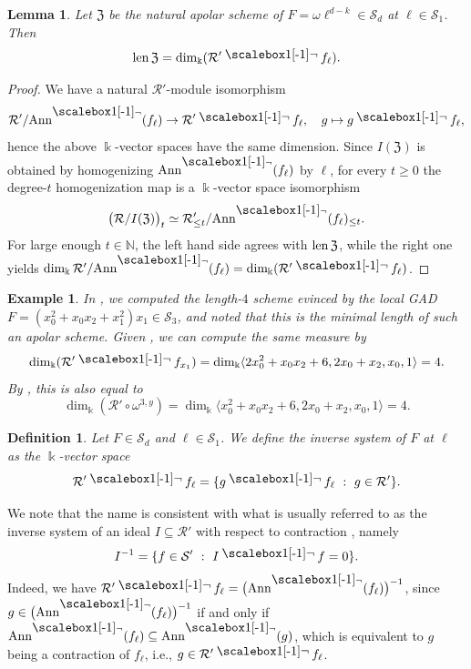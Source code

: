 \documentclass{amsart}
\theoremstyle{plain}
\newtheorem{lemma}[lemma]{Lemma}
\newtheorem{definition}[definition]{Definition}
\newtheorem{example}[example]{Example}
\renewcommand{\k}{\Bbbk}
\renewcommand{\S}{\mathcal{S}}
\newcommand{\N}{\mathbb{N}}
\newcommand{\Ann}{\textnormal{Ann}}
\newcommand{\len}{\textnormal{len}\,}
\newcommand{\contract}{\mathbin{\mathpalette\dointprod\relax}}
\newcommand{\dointprod}[2]{%
  \raisebox{\depth}{\scalebox{1}[-1]{$#1\lnot$}}}
\def\R{\mathcal{R}}
\def\Z{\mathfrak{Z}}
\def\Ann{\mathrm{Ann}}
\numberwithin{equation}{section}
\begin{document}
\begin{lemma} \label{lemma:schemedim}
    Let $\Z$ be the natural apolar scheme of $F = \omega \ell^{d-k} \in \S_d$ at $\ell \in \S_1$. Then
    \[ \len \Z = \dim_{\k} (\R' \contract f_{\ell}). \]
\end{lemma}
\begin{proof}
    We have a natural $\R'$-module isomorphism
    \[ \R'/\Ann^{\contract}(f_{\ell}) \to \R' \contract f_{\ell}, \quad g \mapsto g \contract f_\ell, \]
    hence the above $\k$-vector spaces have the same dimension.
    Since $I(\Z)$ is obtained by homogenizing $\Ann^{\contract}(f_{\ell})$ by $\ell$, for every $t\geq 0$ the degree-$t$ homogenization map is a $\k$-vector space isomorphism \cite[Chap. 9, Thm. 3.12]{CLOS07}
    \[ \big(\R/I(\Z)\big)_t \simeq \R'_{\leq t}/\Ann^{\contract}(f_{\ell})_{\leq t}. \] 
    For large enough $t \in \N$, the left hand side agrees with $\len \Z$, while the right one yields $\dim_{\k} \R'/\Ann^{\contract}(f_{\ell}) = \dim_{\k} (\R' \contract f_{\ell})$.
\end{proof}

\begin{example}
    In , we computed the length-$4$ scheme evinced by the local GAD $F = (x_0^2+x_0x_2+x_1^2)x_1 \in \S_3$, and noted that this is the minimal length of such an apolar scheme.
    Given , we can compute the same measure by
    \[ \dim_{\k} (\R' \contract f_{x_1}) = \dim_{\k} \langle 2x_0^2 + x_0x_2 + 6, 2x_0 + x_2, x_0, 1 \rangle = 4. \]
    By , this is also equal to
    \[ \dim_{\k} (\R' \circ \omega^{3,y}) = \dim_{\k} \langle x_0^2 + x_0x_2 + 6, 2x_0 + x_2, x_0, 1 \rangle = 4. \]
\end{example}

\begin{definition}
     Let $F \in \S_d$ and $\ell \in \S_1$. We define the \emph{inverse system of $F$ at $\ell$} as the $\k$-vector space
     \[ \R' \contract f_{\ell} = \{g \contract f_{\ell} \ : \ g \in \R' \}. \]
\end{definition}
We note that the name is consistent with what is usually referred to as the inverse system of an ideal $I \subseteq \R'$ with respect to contraction \cite{CI12}, namely
\[ I^{-1} = \{f \in \S' \ : \ I \contract f = 0 \}. \]
Indeed, we have $\R'\contract f_{\ell} = \big(\Ann^{\contract}(f_{\ell})\big)^{-1}$, since $g\in \big(\Ann^{\contract}(f_{\ell})\big)^{-1}$ if and only if $\Ann^{\contract}(f_{\ell})\subseteq \Ann^{\contract}(g)$, which is equivalent to $g$ being a contraction of $f_{\ell}$, i.e., $g \in \R'\contract f_{\ell}$.
\end{document}
